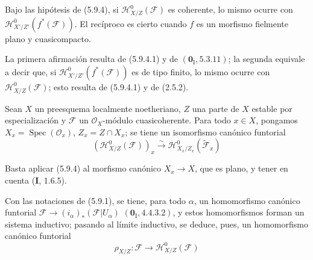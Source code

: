 \begin{corollary}[5.9.5]
\label{IV.2.s5.9.5-fr}
Bajo las hipótesis de \textup{(5.9.4)}, si
$\mathcal H^0_{X/Z}(\mathcal F)$ es coherente, lo mismo ocurre con
$\mathcal H^0_{X'/Z'}(f^*(\mathcal F))$. El recíproco es cierto cuando $f$
es un morfismo fielmente plano y cuasicompacto.
\end{corollary}

La primera afirmación resulta de (5.9.4.1) y de
$(\mathbf{0}_{\mathrm I},5.3.11)$; la segunda equivale a decir que, si
$\mathcal H^0_{X'/Z'}(f^*(\mathcal F))$ es de tipo finito, lo mismo ocurre
con $\mathcal H^0_{X/Z}(\mathcal F)$; esto resulta de (5.9.4.1) y de (2.5.2).

\begin{corollary}[5.9.6]
\label{IV.2.s5.9.6-fr}
Sean $X$ un preesquema localmente noetheriano, $Z$ una parte de $X$ estable
por especialización y $\mathcal F$ un $\mathcal O_X$-módulo cuasicoherente.
Para todo $x\in X$, pongamos $X_x=\operatorname{Spec}(\mathcal O_x)$,
$Z_x=Z\cap X_x$; se tiene un isomorfismo canónico funtorial
\begin{equation}
(\mathcal H^0_{X/Z}(\mathcal F))_x
\xrightarrow{\sim}\mathcal H^0_{X_x/Z_x}(\widetilde{\mathcal F}_x)
\tag{5.9.6.1}\label{IV.2.s5.9.6.1-fr}
\end{equation}
\end{corollary}

Basta aplicar (5.9.4) al morfismo canónico $X_x\to X$, que es plano, y tener
en cuenta (\textbf I, 1.6.5).

\begin{env}[5.9.7]
\label{IV.2.s5.9.7-fr}
Con las notaciones de (5.9.1), se tiene, para todo $\alpha$, un homomorfismo
canónico funtorial
$\mathcal F\longrightarrow(i_\alpha)_*(\mathcal F|U_\alpha)$
$(\mathbf{0}_{\mathrm I},4.4.3.2)$,
y estos homomorfismos forman un sistema inductivo; pasando al límite
inductivo, se deduce, pues, un homomorfismo canónico funtorial
\begin{equation}
\rho_{X/Z}:\mathcal F\longrightarrow\mathcal H^0_{X/Z}(\mathcal F)
\tag{5.9.7.1}\label{IV.2.s5.9.7.1-fr}
\end{equation}
\end{env}

